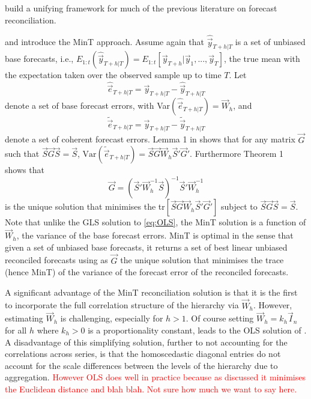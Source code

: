 \documentclass[graybox]{svmult}
\begin{document}
\cite{WicEtAl2019} build a unifying framework for much of the previous literature on forecast reconciliation. 

 and introduce the MinT approach. Assume again that $\hat{\vec{y}}_{T+h|T}$ is a set of unbiased base forecasts, i.e., $E_{1:t}(\hat{\vec{y}}_{T+h|T})= E_{1:t}[\vec{y}_{T+h}|\vec{y}_1,...,\vec{y}_T]$, the true mean with the expectation taken over the observed sample up to time $T$.
Let
\begin{equation}\label{eq:base errors}
\hat{\vec{e}}_{T+h|T} = \vec{y}_{T+h|T}-\hat{\vec{y}}_{T+h|T}
\end{equation}
denote a set of base forecast errors, with Var$(\hat{\vec{e}}_{T+h|T})=\vec{W}_h$, and
\begin{equation*}
\tilde{\vec{e}}_{T+h|T} = \vec{y}_{T+h|T}-\tilde{\vec{y}}_{T+h|T}
\end{equation*} denote a set of coherent forecast errors. Lemma 1 in \cite{WicEtAl2019} shows that for any matrix $\vec{G}$ such that $\vec{S}\vec{G}\vec{S}=\vec{S}$, $\text{Var}(\tilde{\vec{e}}_{T+h|T})=\vec{S}\vec{G}\vec{W}_h\vec{S}'\vec{G}'
$. Furthermore Theorem 1 shows that
\begin{equation} \label{eq:MinT}
\vec{G} = (\vec{S}'{\vec{W}}^{-1}_h\vec{S})^{-1}\vec{S}'{\vec{W}}^{-1}_h
\end{equation}
is the unique solution that minimises the tr$[\vec{S}\vec{G}\vec{W}_h\vec{S}'\vec{G}']$ subject to $\vec{S}\vec{G}\vec{S}=\vec{S}$. Note that unlike the GLS solution to \eqref{eq:OLS}, the MinT solution is a function of $\vec{W}_h$, the variance of the base forecast errors. MinT is optimal in the sense that given a set of unbiased base forecasts, it returns a set of best linear unbiased reconciled forecasts using as $\vec{G}$ the unique solution that minimises the trace (hence MinT) of the variance of the forecast error of the reconciled forecasts. 

A significant advantage of the MinT reconciliation solution is that it is the first to incorporate the full correlation structure of the hierarchy via ${\vec{W}}_{h}$. However, estimating ${\vec{W}}_{h}$ is challenging, especially for $h>1$. Of course setting ${\vec{W}}_{h}=k_h\vec{I}_n$ for all $h$ where $k_h>0$ is a proportionality constant, leads to the OLS solution of \cite{HynEtAl2011}. A disadvantage of this simplifying solution, further to not accounting for the correlations across series, is that the homoscedastic diagonal entries do not account for the scale differences between the levels of the hierarchy due to aggregation. \textcolor{red}{However OLS does well in practice because as discussed it minimises the Euclidean distance and blah blah. Not sure how much we want to say here.}
\end{document}
